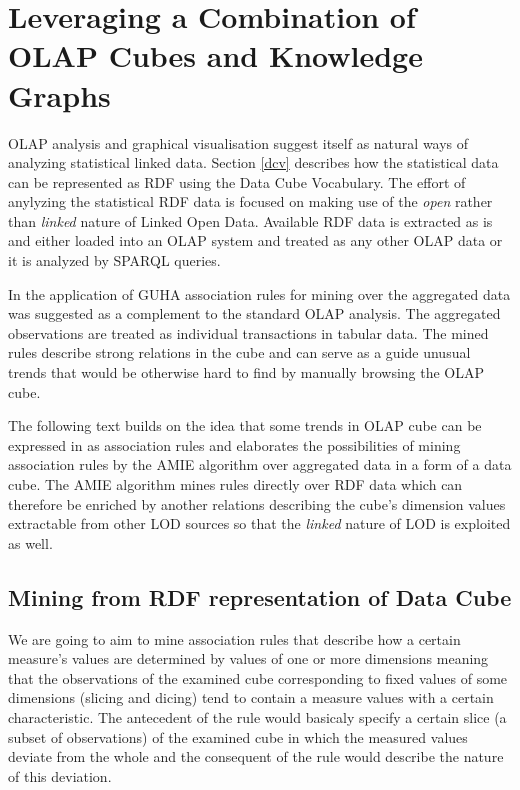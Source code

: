 \chapter{Leveraging a Combination of OLAP Cubes and Knowledge Graphs\label{combining}}

OLAP analysis and graphical visualisation suggest itself as natural ways of analyzing statistical linked data. Section \ref{dcv} describes how the statistical data can be represented as RDF using the Data Cube Vocabulary. The effort of anylyzing the statistical RDF data is focused on making use of the \textit{open} rather than \textit{linked} nature of Linked Open Data. Available RDF data is extracted as is and either loaded into an OLAP system  and treated as any other OLAP data \cite{Kämpgen2011} or it is analyzed by SPARQL queries.\cite{Capadisli2013} 

In \cite{Chudan2015} the application of GUHA \cite{Rauch2017} association rules for mining over the aggregated data was suggested as a complement to the standard OLAP analysis. The aggregated observations are treated as individual transactions in tabular data. The mined rules describe strong relations in the cube and can serve as a guide unusual trends that would be otherwise hard to find by manually browsing the OLAP cube.

The following text builds on the idea that some trends in OLAP cube can be expressed in as association rules and elaborates the possibilities of mining association rules by the AMIE algorithm over aggregated data in a form of a data cube. The AMIE algorithm mines rules directly over RDF data which can therefore be enriched by another relations describing the cube's dimension values extractable from other LOD sources so that the \textit{linked} nature of LOD is exploited as well.

\section{Mining from RDF representation of Data Cube}

We are going to aim to mine association rules that describe how a certain measure's values are determined by values of one or more dimensions meaning that the observations of the examined cube corresponding to fixed values of some dimensions (slicing and dicing) tend to contain a measure values with a certain characteristic. The antecedent of the rule would basicaly specify a certain slice (a subset of observations) of the examined cube in which the measured values deviate from the whole and the consequent of the rule would describe the nature of this deviation.

